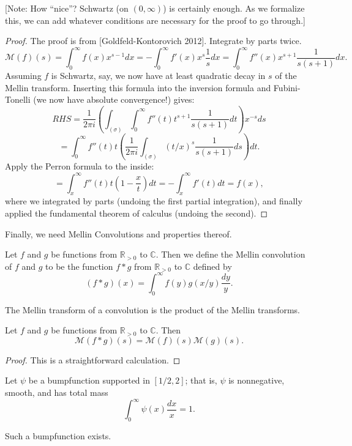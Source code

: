[Note: How ``nice''? Schwartz (on $(0,\infty)$) is certainly enough. As we formalize this, we can add whatever conditions are necessary for the proof to go through.]



\begin{proof}
The proof is from [Goldfeld-Kontorovich 2012].
Integrate by parts twice.
$$
\mathcal{M}(f)(s) = \int_0^\infty f(x)x^{s-1}dx = - \int_0^\infty f'(x)x^s\frac{1}{s}dx = \int_0^\infty f''(x)x^{s+1}\frac{1}{s(s+1)}dx.
$$
Assuming $f$ is Schwartz, say, we now have at least quadratic decay in $s$ of the Mellin transform. Inserting this formula into the inversion formula and Fubini-Tonelli (we now have absolute convergence!) gives:
$$
RHS = \frac{1}{2\pi i}\left(\int_{(σ)}\int_0^\infty f''(t)t^{s+1}\frac{1}{s(s+1)}dt\right) x^{-s}ds
$$
$$
= \int_0^\infty f''(t) t \left( \frac{1}{2\pi i}\int_{(σ)}(t/x)^s\frac{1}{s(s+1)}ds\right) dt.
$$
Apply the Perron formula to the inside:
$$
= \int_x^\infty f''(t) t \left(1-\frac{x}{t}\right)dt
= -\int_x^\infty f'(t) dt
= f(x),
$$
where we integrated by parts (undoing the first partial integration), and finally applied the fundamental theorem of calculus (undoing the second).
\end{proof}



Finally, we need Mellin Convolutions and properties thereof.
\begin{definition}\label{MellinConvolution}
Let $f$ and $g$ be functions from $\mathbb{R}_{>0}$ to $\mathbb{C}$. Then we define the Mellin convolution of $f$ and $g$ to be the function $f\ast g$ from $\mathbb{R}_{>0}$ to $\mathbb{C}$ defined by
$$(f\ast g)(x) = \int_0^\infty f(y)g(x/y)\frac{dy}{y}.$$
\end{definition}



The Mellin transform of a convolution is the product of the Mellin transforms.
\begin{theorem}\label{MellinConvolutionTransform}
Let $f$ and $g$ be functions from $\mathbb{R}_{>0}$ to $\mathbb{C}$. Then
$$\mathcal{M}(f\ast g)(s) = \mathcal{M}(f)(s)\mathcal{M}(g)(s).$$
\end{theorem}



\begin{proof}
This is a straightforward calculation.
\end{proof}



Let $\psi$ be a bumpfunction supported in $[1/2,2]$; that is, $\psi$ is nonnegative, smooth, and has total mass
$$
\int_0^\infty \psi(x)\frac{dx}{x} = 1.
$$
\begin{theorem}\label{SmoothExistence}
Such a bumpfunction exists.
\end{theorem}



